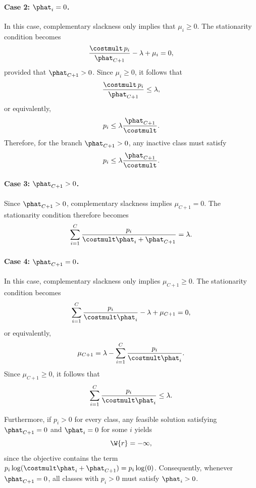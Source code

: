 \paragraph{Case 2: $\phat_i=0$.}
In this case, complementary slackness only implies that $\mu_i\ge0$. The stationarity condition becomes
\begin{align*}
    \frac{\costmult\,p_i}
    {\phat_{C+1}}
    -\lambda+\mu_i
    =0,
\end{align*}
provided that $\phat_{C+1}>0$. Since $\mu_i\ge0$, it follows that
\begin{align*}
    \frac{\costmult\,p_i}{\phat_{C+1}}
    \le
    \lambda,
\end{align*}
or equivalently,
\begin{align*}
    p_i
    \le
    \lambda\frac{\phat_{C+1}}{\costmult}.
\end{align*}
Therefore, for the branch $\phat_{C+1}>0$, any inactive class must satisfy
\[
    p_i \le \lambda\frac{\phat_{C+1}}{\costmult}.
\]

\paragraph{Case 3: $\phat_{C+1}>0$.}
Since $\phat_{C+1}>0$, complementary slackness implies
$\mu_{C+1}=0$. The stationarity condition therefore becomes
\begin{align*}
    \sum_{i=1}^{C}
    \frac{p_i}
    {\costmult\phat_i+\phat_{C+1}}
    =
    \lambda.
\end{align*}

\paragraph{Case 4: $\phat_{C+1}=0$.}
In this case, complementary slackness only implies
$\mu_{C+1}\ge0$. The stationarity condition becomes
\begin{align*}
    \sum_{i=1}^{C}
    \frac{p_i}
    {\costmult\phat_i}
    -\lambda+\mu_{C+1}
    =0,
\end{align*}
or equivalently,
\begin{align*}
    \mu_{C+1}
    =
    \lambda
    -
    \sum_{i=1}^{C}
    \frac{p_i}
    {\costmult\phat_i}.
\end{align*}
Since $\mu_{C+1}\ge0$, it follows that
\begin{align*}
    \sum_{i=1}^{C}
    \frac{p_i}
    {\costmult\phat_i}
    \le
    \lambda.
\end{align*}

Furthermore, if $p_i>0$ for every class, any feasible solution satisfying
$\phat_{C+1}=0$ and $\phat_i=0$ for some $i$ yields
\[
    \W{r}=-\infty,
\]
since the objective contains the term
$p_i\log(\costmult\phat_i+\phat_{C+1})=p_i\log(0)$.
Consequently, whenever $\phat_{C+1}=0$, all classes with $p_i>0$ must satisfy
$\phat_i>0$.



